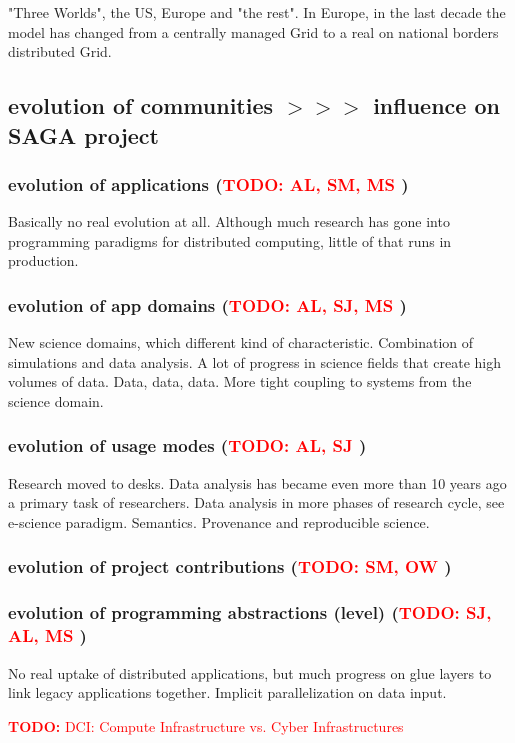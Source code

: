 \documentclass{article}
\newcommand{\B}[1]{\textbf{#1}}
\newcommand{\nind}{\noindent}
\newcommand{\todo}[1]{{\textcolor{red}{\B{TODO:} #1 }}}
\begin{document}
 "Three Worlds", the US, Europe and "the rest".  In Europe, in the
 last decade the model has changed from a centrally managed Grid to a
 real on national borders distributed Grid.\\

 
 \nind
 \subsection{ evolution of communities  $>>>$ influence on SAGA project}
 \subsubsection{ evolution of applications (\todo{AL, SM, MS})}
 
 Basically no real evolution at all. Although much research has gone
 into programming paradigms for distributed computing, little of that
 runs in production.
 
 \subsubsection{ evolution of app domains (\todo{AL, SJ, MS})}
 
 New science domains, which different kind of characteristic.
 Combination of simulations and data analysis. A lot of progress in
 science fields that create high volumes of data.  Data, data, data.
 More tight coupling to systems from the science domain.
 
 \subsubsection{ evolution of usage modes (\todo{AL, SJ})}
 
 Research moved to desks. Data analysis has became even more than 10
 years ago a primary task of researchers.  Data analysis in more
 phases of research cycle, see e-science paradigm.  Semantics.
 Provenance and reproducible science.
  
 \subsubsection{ evolution of project contributions (\todo{SM, OW})}
 
 \subsubsection{ evolution of programming abstractions (level) (\todo{SJ, AL, MS})}
 
 No real uptake of distributed applications, but much progress on glue
 layers to link legacy applications together.  Implicit
 parallelization on data input.


\newpage

\todo{DCI: Compute Infrastructure vs. Cyber Infrastructures}

\footnotesize


\end{document}
